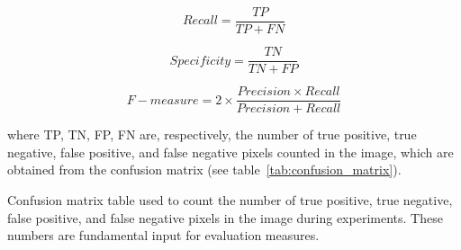 \begin{equation*}
    Recall = \frac{TP}{TP + FN}
    \label{eq:recall}
\end{equation*}

\begin{equation*}
    Specificity = \frac{TN}{TN + FP}
    \label{eq:specificity}
\end{equation*}

\begin{equation*}
    F-measure = 2 \times \frac{Precision \times Recall}{Precision + Recall}
    \label{eq:fmeasure}
\end{equation*}

where TP, TN, FP, FN are, respectively, the number of true positive, true negative, false positive, and false negative pixels counted in the image, which are obtained from the confusion matrix (see table~\ref{tab:confusion_matrix}).

\begin{table}[H]
    \centering


    \caption[Confusion matrix table used during experiments]{Confusion matrix table used to count the number of true positive, true negative, false positive, and false negative pixels in the image during experiments. These numbers are fundamental input for evaluation measures.}
    \label{tab:confusion_matrix}
\end{table}




